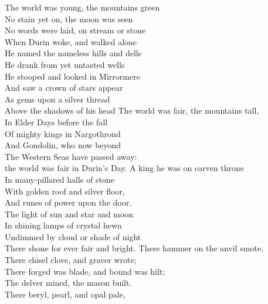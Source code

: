 
The world was young, the mountains green \\
No stain yet on, the moon was seen \\
No words were laid, on stream or stone \\
When Durin woke, and walked alone \\
\hop
He named the nameless hills and dells \\
He drank from yet untasted wells \\
He stooped and looked in Mirrormere \\
And saw a crown of stars appear \\
As gems upon a silver thread \tab{}\\
Above the shadows of his head 
\hops
The world was fair, the mountains tall, \\
In Elder Days before the fall \tab{}\\
Of mighty kings in Nargothrond \\
And Gondolin, who now beyond \\
The Western Seas have passed away: \\
the world was fair in Durin's Day. 
\hops
{}
A king he was on carven throne \\
In many-pillared halls of stone \tab{}\\
With golden roof and silver floor, \\
And runes of power upon the door. \\
The light of sun and star and moon \\
In shining lamps of crystal hewn \\
Undimmed by cloud or shade of night \\
There shone for ever fair and bright. 
\hops
There hammer on the anvil smote, \\
There chisel clove, and graver wrote; \\
There forged was blade, and bound was hilt; \\
The delver mined, the mason built. \\
There beryl, pearl, and opal pale, \\
